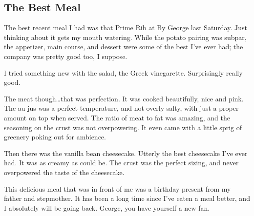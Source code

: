 \documentclass[12pt]{article}
\begin{document}
\begin{enumerate}
\end{enumerate}

\pagebreak
\subsection{The Best Meal}

The best recent meal I had was that Prime Rib at By George last Saturday.
Just thinking about it gets my mouth watering.
While the potato pairing was subpar, the appetizer, main course, and dessert were some of the best I've ever had; the company was pretty good too, I suppose.

I tried something new with the salad, the Greek vinegarette.
Surprisingly really good.

The meat though\ldots that was perfection.
It was cooked beautifully, nice and pink.
The au jus was a perfect temperature, and not overly salty, with just a proper amount on top when served.
The ratio of meat to fat was amazing, and the seasoning on the crust was not overpowering.
It even came with a little sprig of greenery poking out for ambience.

Then there was the vanilla bean cheesecake. 
Utterly the best cheesecake I've ever had.
It was as creamy as could be.
The crust was the perfect sizing, and never overpowered the taste of the cheesecake.

This delicious meal that was in front of me was a birthday present from my father and stepmother.
It has been a long time since I've eaten a meal better, and I absolutely will be going back.
George, you have yourself a new fan.
\end{document}
